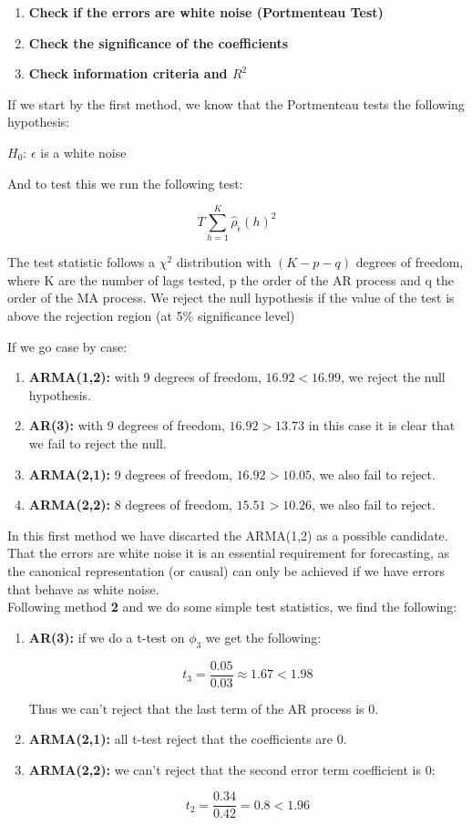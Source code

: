 \documentclass{article}
\begin{document}
\begin{enumerate}
  \item \textbf{Check if the errors are white noise (Portmenteau Test)}
  \item \textbf{Check the significance of the coefficients}
  \item \textbf{Check information criteria and $R^{2}$}
\end{enumerate}

If we start by the first method, we know that the Portmenteau tests the following hypothesis: 


$H_{0}$: $\epsilon$ is a white noise


And to test this we run the following test:

\[
T\sum_{h=1}^{K}\hat{\rho}_{\hat{\epsilon}}(h)^{2}
\]

The test statistic follows a $\chi^{2}$ distribution with ${(K-p-q)}$ degrees of freedom, where
K are the number of lags tested, p the order of the AR process and q the order of the MA process. We
reject the null hypothesis if the value of the test is above the rejection region (at 5\% significance level)

If we go case by case:

\begin{enumerate}
  \item \textbf{ARMA(1,2):} with 9 degrees of freedom, $16.92<16.99$, we reject the null hypothesis.
  \item \textbf{AR(3):} with 9 degrees of freedom, $16.92>13.73$ in this case it is clear that we fail to reject the null. 
  \item \textbf{ARMA(2,1):} 9 degrees of freedom, $16.92>10.05$, we also fail to reject.
  \item \textbf{ARMA(2,2):} 8 degrees of freedom, $15.51>10.26$, we also fail to reject.

\end{enumerate}

In this first method we have discarted the ARMA(1,2) as a possible candidate. That the errors are
white noise it is an essential requirement for forecasting, as the canonical representation (or causal) can only
be achieved if we have errors that behave as white noise. \\

Following method \textbf{2} and we do some simple test statistics, we find the following: 

\begin{enumerate}
  \item \textbf{AR(3):} if we do a t-test on $\phi_{3}$ we get the following:

\[
t_{3}=\frac{0.05}{0.03}\approx1.67<1.98
\]

Thus we can't reject that the last term of the AR process is 0.


  \item \textbf{ARMA(2,1):} all t-test reject that the coefficients are 0.
  \item \textbf{ARMA(2,2):} we can't reject that the second error term coefficient is 0:
  
\[
t_{2}=\frac{0.34}{0.42}=0.8<1.96
\]

\end{enumerate}
\end{document}
